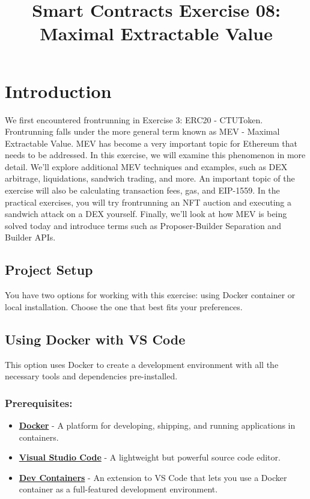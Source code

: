 \documentclass[12pt]{article}
\title{Smart Contracts Exercise 08: \\ Maximal Extractable Value}
\author{}
\date{}
\begin{document}
\maketitle
\section{Introduction}

We first encountered frontrunning in Exercise 3: ERC20 - CTUToken. Frontrunning falls under the more general term known as MEV - Maximal Extractable Value. MEV has become a very important topic for Ethereum that needs to be addressed. In this exercise, we will examine this phenomenon in more detail. We'll explore additional MEV techniques and examples, such as DEX arbitrage, liquidations, sandwich trading, and more. An important topic of the exercise will also be calculating transaction fees, gas, and EIP-1559. In the practical exercises, you will try frontrunning an NFT auction and executing a sandwich attack on a DEX yourself. Finally, we'll look at how MEV is being solved today and introduce terms such as Proposer-Builder Separation and Builder APIs.

\subsection*{Project Setup}

You have two options for working with this exercise: using Docker container or local installation. Choose the one that best fits your preferences.

\subsection{Using Docker with VS Code}

This option uses Docker to create a development environment with all the necessary tools and dependencies pre-installed.

\subsubsection*{Prerequisites:}

\begin{itemize}
    \item \textbf{\href{https://www.docker.com/products/docker-desktop}{Docker}} - A platform for developing, shipping, and running applications in containers.
    \item \textbf{\href{https://code.visualstudio.com/}{Visual Studio Code}} - A lightweight but powerful source code editor.
    \item \textbf{\href{https://marketplace.visualstudio.com/items?itemName=ms-vscode-remote.remote-containers}{Dev Containers}} - An extension to VS Code that lets you use a Docker container as a full-featured development environment.
\end{itemize}
\end{document}
